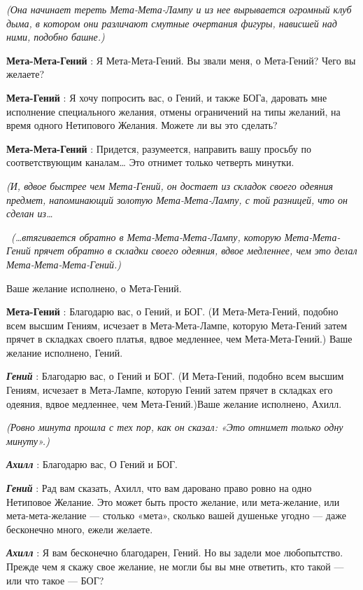 \emph{(Она начинает тереть Мета-Мета-Лампу и из нее вырывается огромный клуб дыма, в котором они различают смутные очертания фигуры, нависшей над ними, подобно башне.)}

\textbf{Мета-Мета-Гений} : Я Мета-Мета-Гений. Вы звали меня, о Мета-Гений? Чего вы желаете?

\textbf{Мета-Гений} : Я хочу попросить вас, о Гений, и также БОГа, даровать мне исполнение специального желания, отмены ограничений на типы желаний, на время одного Нетипового Желания. Можете ли вы это сделать?

\textbf{Мета-Мета-Гений} : Придется, разумеется, направить вашу просьбу по соответствующим каналам\ldots{} Это отнимет только четверть минутки.

\emph{(И, вдвое быстрее чем Мета-Гений, он достает из складок своего одеяния предмет, напоминающий золотую Мета-Мета-Лампу, с той разницей, что он сделан из\ldots{}}

~\emph{(\ldots втягивается обратно в Мета-Мета-Мета-Лампу, которую Мета-Мета-Гений прячет обратно в складки своего одеяния, вдвое медленнее, чем это делал Мета-Мета-Мета-Гений.)}

Ваше желание исполнено, о Мета-Гений.

\textbf{Мета-Гений} : Благодарю вас, о Гений, и БОГ. (И Мета-Мета-Гений, подобно всем высшим Гениям, исчезает в Мета-Мета-Лампе, которую Мета-Гений затем прячет в складках своего платья, вдвое медленнее, чем Мета-Мета-Гений.) Ваше желание исполнено, Гений.

\emph{\textbf{Гений}} : Благодарю вас, о Гений и БОГ. (И Мета-Гений, подобно всем высшим Гениям, исчезает в Мета-Лампе, которую Гений затем прячет в складках его одеяния, вдвое медленнее, чем Мета-Гений.)Ваше желание исполнено, Ахилл.

\emph{(Ровно минута прошла с тех пор, как он сказал: «Это отнимет только одну минуту».)}

\emph{\textbf{Ахилл}} : Благодарю вас, О Гений и БОГ.

\emph{\textbf{Гений}} : Рад вам сказать, Ахилл, что вам даровано право ровно на одно Нетиповое Желание. Это может быть просто желание, или мета-желание, или мета-мета-желание --- столько «мета», сколько вашей душеньке угодно --- даже бесконечно много, ежели желаете.

\emph{\textbf{Ахилл}} : Я вам бесконечно благодарен, Гений. Но вы задели мое любопытство. Прежде чем я скажу свое желание, не могли бы вы мне ответить, кто такой --- или что такое --- БОГ?

